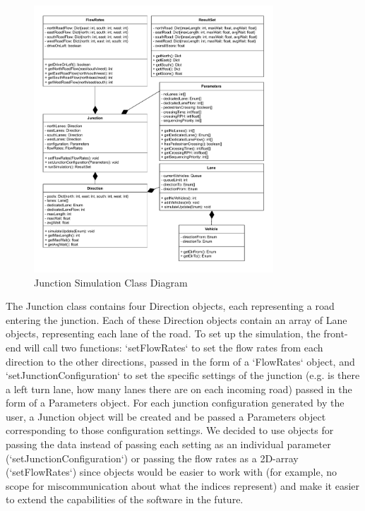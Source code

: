 \documentclass{article}
\begin{document}
\begin{figure}[H]
    \centering
    \includegraphics[width=0.8\textwidth]{JunctionSimulationClassDiagram.drawio.pdf}
    \caption{Junction Simulation Class Diagram}
    \label{class diagram}
\end{figure}

The Junction class contains four Direction objects, each representing a road entering the junction. Each of these Direction 
objects contain an array of Lane objects, representing each lane of the road. To set up the simulation, the front-end will 
call two functions: `setFlowRates` to set the flow rates from each direction to the other directions, passed in the form of 
a `FlowRates` object, and `setJunctionConfiguration` to set the specific settings of the junction (e.g. is there a left turn 
lane, how many lanes there are on each incoming road) passed in the form of a Parameters object. For each junction configuration 
generated by the user, a Junction object will be created and be passed a Parameters object corresponding to those configuration 
settings. We decided to use objects for passing the data instead of passing each setting as an individual parameter 
(`setJunctionConfiguration`) or passing the flow rates as a 2D-array (`setFlowRates`) since objects would be easier to work with 
(for example, no scope for miscommunication about what the indices represent) and make it easier to extend the capabilities of 
the software in the future.
\end{document}
